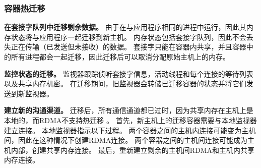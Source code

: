 
\subsubsection{容器热迁移}
\label{socksdirect:subsubsec:container_live_migration}


\textbf {在套接字队列中迁移剩余数据。}
由于\libipc {}在与应用程序相同的进程中运行，因此其内存状态将与应用程序一起迁移到新主机。
内存状态包括套接字队列，因此不会丢失正在传输（已发送但未接收）的数据。
套接字只能在容器内共享，并且容器中的所有进程都会一起迁移，因此迁移后可以取消分配原始主机上的内存。

\textbf {监控状态的迁移。}
监视器跟踪侦听套接字信息，活动线程和每个连接的等待列表以及共享内存机密。
在迁移期间，旧监视器会转储已迁移容器的状态并将它们发送到新监视器。

\textbf {建立新的沟通渠道。}
迁移后，所有通信通道都已过时，因为共享内存在主机上是本地的，而RDMA不支持热迁移 \cite{nsdi19freeflow,slim}。
首先，新主机上的迁移容器需要与本地监视器建立连接。
本地监视器指示以下过程。
两个容器之间的主机内连接可能变为主机间，因此\libipc {}在这种情况下创建RDMA连接。
两个容器之间的主机间连接可能成为主机内部，\libipc {}创建共享内存连接。
最后，\libipc {}重新建立剩余的主机间RDMA和主机内共享内存连接。


%


